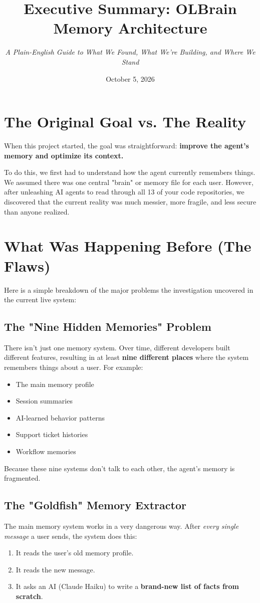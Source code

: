 \documentclass[12pt]{article}
\title{\textbf{Executive Summary: OLBrain Memory Architecture}}
\author{\textit{A Plain-English Guide to What We Found, What We're Building, and Where We Stand}}
\date{October 5, 2026}
\begin{document}
\maketitle

\section{The Original Goal vs. The Reality}

When this project started, the goal was straightforward: \textbf{improve the agent's memory and optimize its context.} 

To do this, we first had to understand how the agent currently remembers things. We assumed there was one central "brain" or memory file for each user. However, after unleashing AI agents to read through all 13 of your code repositories, we discovered that the current reality was much messier, more fragile, and less secure than anyone realized.

\section{What Was Happening Before (The Flaws)}

Here is a simple breakdown of the major problems the investigation uncovered in the current live system:

\subsection{The "Nine Hidden Memories" Problem}
There isn't just one memory system. Over time, different developers built different features, resulting in at least \textbf{nine different places} where the system remembers things about a user. For example:
\begin{itemize}[noitemsep]
    \item The main memory profile
    \item Session summaries
    \item AI-learned behavior patterns
    \item Support ticket histories
    \item Workflow memories
\end{itemize}

Because these nine systems don't talk to each other, the agent's memory is fragmented. 

\subsection{The "Goldfish" Memory Extractor}
The main memory system works in a very dangerous way. After \textit{every single message} a user sends, the system does this:
\begin{enumerate}[noitemsep]
    \item It reads the user's old memory profile.
    \item It reads the new message.
    \item It asks an AI (Claude Haiku) to write a \textbf{brand-new list of facts from scratch}.
\end{enumerate}
\end{document}
